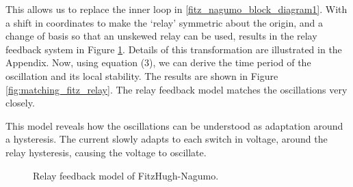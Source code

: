 \documentclass[a4paper, 12pt]{article}
\begin{document}
This allows us to replace the inner loop in \ref{fitz_nagumo_block_diagram1}. With a shift in coordinates to make the `relay' symmetric about the origin, and a change of basis so that an unskewed relay can be used, results in the relay feedback system in Figure \ref{fig:fitz_nagumo_relay_block_diagram}. Details of this transformation are illustrated in the Appendix. Now, using equation (3), we can derive the time period of the oscillation and its local stability. The results are shown in Figure \ref{fig:matching_fitz_relay}. The relay feedback model matches the oscillations very closely. 

This model reveals how the oscillations can be understood as adaptation around a hysteresis. The current slowly adapts to each switch in voltage, around the relay hysteresis, causing the voltage to oscillate. 

\begin{figure}[h!]

\caption{Relay feedback model of FitzHugh-Nagumo.}
\label{fig:fitz_nagumo_relay_block_diagram}
\end{figure}
\end{document}
